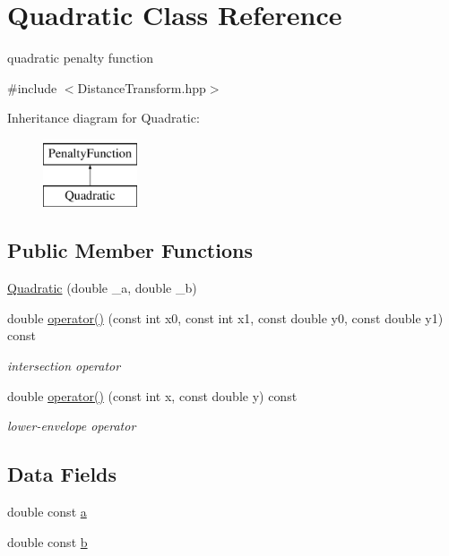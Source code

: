 \hypertarget{classQuadratic}{\section{Quadratic Class Reference}
\label{classQuadratic}
}


quadratic penalty function  




{\ttfamily \#include $<$Distance\-Transform.\-hpp$>$}

Inheritance diagram for Quadratic\-:\begin{figure}[H]
\begin{center}
\leavevmode
\includegraphics[height=2.000000cm]{classQuadratic}
\end{center}
\end{figure}
\subsection*{Public Member Functions}
\begin{DoxyCompactItemize}
\item 
\hyperlink{classQuadratic_aa5d5e8e58a9d0aaf332e6b8b879430b8}{Quadratic} (double \-\_\-a, double \-\_\-b)
\item 
double \hyperlink{classQuadratic_ad074fa92b51e0590f6621b60ac01219a}{operator()} (const int x0, const int x1, const double y0, const double y1) const 
\begin{DoxyCompactList}\small\item\em intersection operator \end{DoxyCompactList}\item 
double \hyperlink{classQuadratic_ae1f3f6d71209aafe6bb1636a8c17489c}{operator()} (const int x, const double y) const 
\begin{DoxyCompactList}\small\item\em lower-\/envelope operator \end{DoxyCompactList}\end{DoxyCompactItemize}
\subsection*{Data Fields}
\begin{DoxyCompactItemize}
\item 
double const \hyperlink{classQuadratic_a3784ebac36b04b9195d44d6d5bc8933a}{a}
\item 
double const \hyperlink{classQuadratic_a1df1154ac27afe4533b5b695831ed23a}{b}
\end{DoxyCompactItemize}
